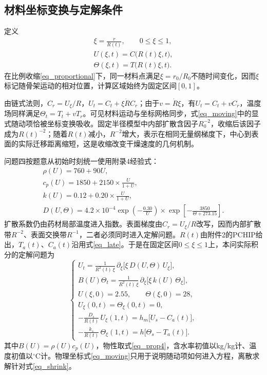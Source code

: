 \subsection{材料坐标变换与定解条件}
定义
\begin{equation}\label{eq_xi}
\begin{gathered}
\xi=\frac{r}{R(t)},\qquad 0\le\xi\le1,\\
U(\xi,t)=C\bigl(R(t)\xi,t\bigr),\\
\Theta(\xi,t)=T\bigl(R(t)\xi,t\bigr).
\end{gathered}
\end{equation}
在比例收缩\eqref{eq_proportional}下，同一材料点满足$\xi=r_0/R_0$不随时间变化，因而$\xi$标记随骨架运动的相对位置，计算区域始终为固定区间$[0,1]$。

由链式法则，$C_r=U_\xi/R$，$U_t=C_t+\xi\dot R C_r$；由于$v=\dot R\xi$，有$U_t=C_t+vC_r$，温度场同样满足$\Theta_t=T_t+vT_r$。可见材料运动与坐标网格同步，式\eqref{eq_moving}中的显式随动项恰被坐标变换吸收。固定半径模型中内部扩散含因子$R_0^{-2}$，收缩后该因子成为$R(t)^{-2}$；随着$R(t)$减小，$R^{-2}$增大，表示在相同无量纲梯度下，中心到表面的实际迁移距离缩短，这是收缩改变干燥速度的几何机制。

问题四按题意从初始时刻统一使用附录4经验式：
\begin{equation}\label{eq_prop4}
\begin{gathered}
\rho(U)=760+90U,\\[4pt]
c_p(U)=1850+2150\times\frac{U}{1+U},\\[4pt]
k(U)=0.12+0.20\times\frac{U}{1+U},\\[6pt]
D(U,\Theta)=4.2\times10^{-4}
\exp\!\left(-\frac{0.30}{U}\right)
\times\exp\!\left[-\frac{3850}{\Theta+273.15}\right].
\end{gathered}
\end{equation}
扩散系数仍由药材局部温度进入指数。表面梯度由$C_r=U_\xi/R$改写，因而内部扩散带$R^{-2}$、表面交换带$R^{-1}$，二者必须同时进入定解问题。$R(t)$由附件2的PCHIP给出，$T_a(t)$、$C_a(t)$沿用式\eqref{eq_late}。于是在固定区间$0\le\xi\le1$上，本问实际积分的定解问题为
\begin{equation}\label{eq_shrink}
\left\{
\begin{gathered}
U_t=\frac{1}{R^{2}(t)\,\xi}\,
\partial_\xi\bigl[\xi\, D(U,\Theta)\, U_\xi\bigr],\\[3pt]
B(U)\Theta_t=\frac{1}{R^{2}(t)\,\xi}\,
\partial_\xi\bigl[\xi\, k(U)\, \Theta_\xi\bigr],\\[5pt]
U(\xi,0)=2.55,\qquad
\Theta(\xi,0)=28,\\[3pt]
U_\xi(0,t)=\Theta_\xi(0,t)=0,\\[5pt]
-\frac{D_s}{R(t)}\,U_\xi(1,t)
=h_m\bigl[U_s-C_a(t)\bigr],\\[3pt]
-\frac{k_s}{R(t)}\,\Theta_\xi(1,t)
=h\bigl[\Theta_s-T_a(t)\bigr].
\end{gathered}
\right.
\end{equation}
其中$B(U)=\rho(U)c_p(U)$，物性取式\eqref{eq_prop4}，含水率初值以kg/kg计、温度初值以$^\circ$C计。物理坐标式\eqref{eq_moving}只用于说明随动项如何进入方程，离散求解针对式\eqref{eq_shrink}。

